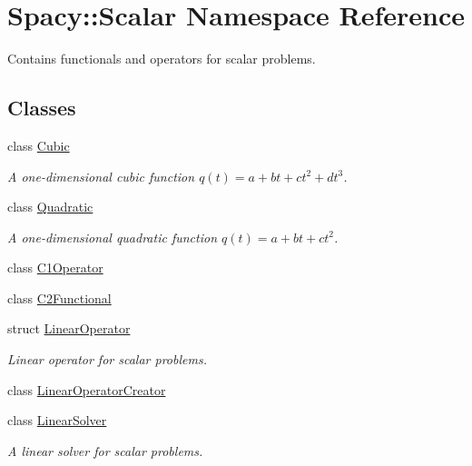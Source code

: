 \hypertarget{namespaceSpacy_1_1Scalar}{\section{\-Spacy\-:\-:\-Scalar \-Namespace \-Reference}
\label{namespaceSpacy_1_1Scalar}
}


\-Contains functionals and operators for scalar problems.  


\subsection*{\-Classes}
\begin{DoxyCompactItemize}
\item 
class \hyperlink{classSpacy_1_1Scalar_1_1Cubic}{\-Cubic}
\begin{DoxyCompactList}\small\item\em \-A one-\/dimensional cubic function $q(t) = a + bt + ct^2 + dt^3$. \end{DoxyCompactList}\item 
class \hyperlink{classSpacy_1_1Scalar_1_1Quadratic}{\-Quadratic}
\begin{DoxyCompactList}\small\item\em \-A one-\/dimensional quadratic function $q(t) = a + bt + ct^2$. \end{DoxyCompactList}\item 
class \hyperlink{classSpacy_1_1Scalar_1_1C1Operator}{\-C1\-Operator}
\item 
class \hyperlink{classSpacy_1_1Scalar_1_1C2Functional}{\-C2\-Functional}
\item 
struct \hyperlink{structSpacy_1_1Scalar_1_1LinearOperator}{\-Linear\-Operator}
\begin{DoxyCompactList}\small\item\em \-Linear operator for scalar problems. \end{DoxyCompactList}\item 
class \hyperlink{classSpacy_1_1Scalar_1_1LinearOperatorCreator}{\-Linear\-Operator\-Creator}
\item 
class \hyperlink{classSpacy_1_1Scalar_1_1LinearSolver}{\-Linear\-Solver}
\begin{DoxyCompactList}\small\item\em \-A linear solver for scalar problems. \end{DoxyCompactList}\end{DoxyCompactItemize}
